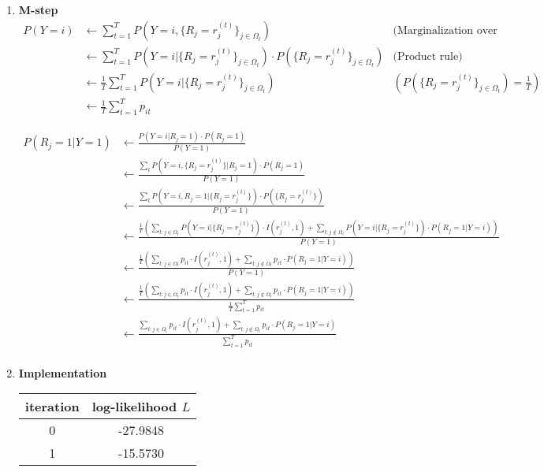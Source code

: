 \documentclass[11]{article}
\begin{document}
\begin{enumerate}[label=(\alph*)]
\item{\textbf{M-step}}
\begin{align*}
P(Y=i) &\longleftarrow \sum_{t=1}^T P(Y=i,\{R_j=r_j^{(t)}\}_{j \in \Omega_t}) & \text{(Marginalization over samples)}\\
&\longleftarrow \sum_{t=1}^T P(Y=i|\{R_j=r_j^{(t)}\}_{j \in \Omega_t}) \cdot P(\{R_j=r_j^{(t)}\}_{j \in \Omega_t}) & \text{(Product rule)}\\
&\longleftarrow \frac{1}{T} \sum_{t=1}^T P(Y=i|\{R_j=r_j^{(t)}\}_{j \in \Omega_t}) & (P(\{R_j=r_j^{(t)}\}_{j \in \Omega_t})=\frac{1}{T})\\
&\longleftarrow \frac{1}{T} \sum_{t=1}^T p_{it}
\end{align*}

\begin{align*}
P(R_j=1|Y=1) &\longleftarrow \frac{P(Y=i|R_j=1) \cdot P(R_j=1)}{P(Y=1)}\\
&\longleftarrow \frac{\sum_t P(Y=i,\{R_j=r_j^{(t)}\}|R_j=1) \cdot P(R_j=1)}{P(Y=1)}\\
&\longleftarrow \frac{\sum_t P(Y=i,R_j=1|\{R_j=r_j^{(t)}\}) \cdot P(\{R_j=r_j^{(t)}\})}{P(Y=1)}\\
&\longleftarrow \frac{\frac{1}{T} (\sum_{t:j \in \Omega_t} P(Y=i|\{R_j=r_j^{(t)}\}) \cdot I(r_j^{(t)},1) + \sum_{t:j \not \in \Omega_t} P(Y=i|\{R_j=r_j^{(t)}\}) \cdot P(R_j=1|Y=i))}{P(Y=1)}\\
&\longleftarrow \frac{\frac{1}{T}(\sum_{t:j \in \Omega_t} p_{it} \cdot I(r_j^{(t)}, 1) + \sum_{t:j \not \in \Omega_t} p_{it} \cdot P(R_j=1|Y=i))}{P(Y=1)}\\
&\longleftarrow \frac{\frac{1}{T}(\sum_{t:j \in \Omega_t} p_{it} \cdot I(r_j^{(t)}, 1) + \sum_{t:j \not \in \Omega_t} p_{it} \cdot P(R_j=1|Y=i))}{\frac{1}{T} \sum_{t=1}^T p_{it}}\\
&\longleftarrow \frac{\sum_{t:j \in \Omega_t} p_{it} \cdot I(r_j^{(t)}, 1) + \sum_{t:j \not \in \Omega_t} p_{it} \cdot P(R_j=1|Y=i)}{\sum_{t=1}^T p_{it}}\\
\end{align*}
\item{\textbf{Implementation}}
\begin{center}
\centering
\begin{tabular}{|c|c|}
\hline
\textbf{iteration} & \textbf{log-likelihood $L$} \\ \hline
0                  & -27.9848                    \\ \hline
1                  & -15.5730                    \\ \hline

\end{tabular}
\end{center}
\end{enumerate}
\end{document}
